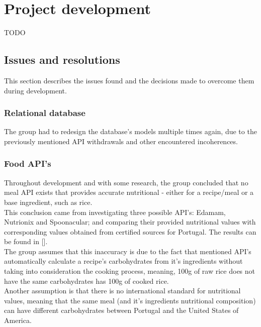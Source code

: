 %
%
\chapter{Project development}


    TODO\\

    \section{Issues and resolutions}

    This section describes the issues found and the decisions made
    to overcome them during development.
    
    \subsection{Relational database}

    The group had to redesign the database's models multiple times again, due to the previously mentioned API withdrawals and other encountered
    incoherences.\\    

    \subsection{Food API's}
    Throughout development and with some research, the group concluded that no meal API exists
    that provides accurate nutritional - either for a recipe/meal or a base ingredient, such as rice.\\

    This conclusion came from investigating three possible API's: Edamam, Nutrionix and Spoonacular; and comparing
    their provided nutritional values with corresponding values obtained from
    certified sources for Portugal. The results can be found in [].\\

    The group assumes that this inaccuracy is due to the fact that
    mentioned API's automatically calculate a recipe's carbohydrates
    from it's ingredients without taking into consideration the cooking process, meaning, 
    100g of raw rice does not have the same carbohydrates has 100g of cooked rice.\\

    Another assumption is that there is no international standard for nutritional values,
    meaning that the same meal (and it's ingredients nutritional composition) 
    can have different carbohydrates between Portugal and the United States of America.\\
    
